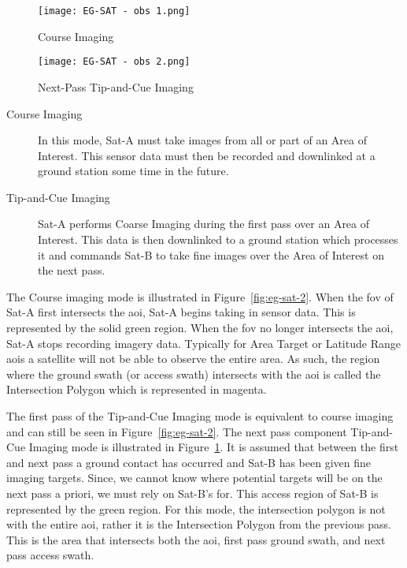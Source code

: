 \begin{figure} 
    \centering
    \begin{minipage}[c]{0.49\textwidth}
	\centering
	\texttt{[image: EG-SAT - obs 1.png]} 
	\caption{Course Imaging}
	\label{fig:eg-sat-2} 
    \end{minipage}
    \hfill
    \begin{minipage}[c]{0.49\textwidth}
	\centering
	\texttt{[image: EG-SAT - obs 2.png]} 
	\caption{Next-Pass Tip-and-Cue Imaging}
	\label{fig:eg-sat-3} 
    \end{minipage} 
\end{figure}

\begin{description} 

    \item[Course Imaging] In this mode, Sat-A must take images from all or part
	of an Area of Interest. This sensor data must then be recorded and
	downlinked at a ground station some time in the future.

    \item[Tip-and-Cue Imaging] Sat-A performs Coarse Imaging during the first
	pass over an Area of Interest. This data is then downlinked to a ground
	station which processes it and commands Sat-B to take fine images over
	the Area of Interest on the next pass.

\end{description}

The Course imaging mode is illustrated in Figure~\ref{fig:eg-sat-2}. When the
\gls{fov} of Sat-A first intersects the \gls{aoi}, Sat-A begins taking in
sensor data. This is represented by the solid green region.  When the \gls{fov}
no longer intersects the \gls{aoi}, Sat-A stops recording imagery data.
Typically for Area Target or Latitude Range \glspl{aoi} a satellite will not be
able to observe the entire area. As such, the region where the ground swath (or
access swath) intersects with the \gls{aoi} is called the Intersection Polygon
which is represented in magenta. 

The first pass of the Tip-and-Cue Imaging mode is equivalent to course imaging
and can still be seen in Figure~\ref{fig:eg-sat-2}. The next pass component
Tip-and-Cue Imaging mode is illustrated in Figure~\ref{fig:eg-sat-3}. It is
assumed that between the first and next pass a ground contact has occurred and
Sat-B has been given fine imaging targets. Since, we cannot know where
potential targets will be on the next pass a priori, we must rely on Sat-B's
\gls{for}.  This access region of Sat-B is represented by the green region. For
this mode, the intersection polygon is not with the entire \gls{aoi}, rather it
is the Intersection Polygon from the previous pass. This is the area that
intersects both the \gls{aoi}, first pass ground swath, and next pass access
swath.  


